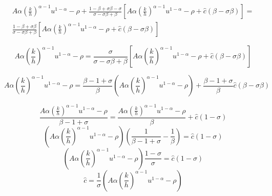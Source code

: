 \begin{equation*}
\begin{split}
A\alpha \left(\frac{k}{h}\right)^{\alpha-1}u^{1- \alpha}-\rho+\frac{1-\beta+\sigma\beta-\sigma}{\sigma-\sigma\beta+\beta}\left[A\alpha \left(\frac{k}{h}\right)^{\alpha-1}u^{1- \alpha}-\rho+\hat{c}(\beta-\sigma\beta)\right]=\\
\frac{1-\beta+\sigma\beta}{\sigma-\sigma\beta+\beta}\left[A\alpha \left(\frac{k}{h}\right)^{\alpha-1}u^{1- \alpha}-\rho+\hat{c}(\beta-\sigma\beta)\right]
\end{split}
\end{equation*}

\begin{equation*}
A\alpha \left(\frac{k}{h}\right)^{\alpha-1}u^{1- \alpha}-\rho=\frac{\sigma}{\sigma-\sigma\beta+\beta}\left[A\alpha \left(\frac{k}{h}\right)^{\alpha-1}u^{1- \alpha}-\rho+\hat{c}(\beta-\sigma\beta)\right]
\end{equation*}

\begin{equation*}
A\alpha \left(\frac{k}{h}\right)^{\alpha-1}u^{1- \alpha}-\rho=\frac{\beta-1+\sigma}{\beta}\left(A\alpha \left(\frac{k}{h}\right)^{\alpha-1}u^{1- \alpha}-\rho\right)+\frac{\beta-1+\sigma}{\beta}\hat{c}(\beta-\sigma\beta)
\end{equation*}

\begin{equation*}
\frac{A\alpha \left(\frac{k}{h}\right)^{\alpha-1}u^{1- \alpha}-\rho}{\beta-1+\sigma}=\frac{A\alpha \left(\frac{k}{h}\right)^{\alpha-1}u^{1- \alpha}-\rho}{\beta}+\hat{c}(1-\sigma)
\end{equation*}
\begin{equation*}
\left(A\alpha \left(\frac{k}{h}\right)^{\alpha-1}u^{1- \alpha}-\rho\right)\left(\frac{1}{\beta-1+\sigma}-\frac{1}{\beta}\right)=\hat{c}(1-\sigma)
\end{equation*}
\begin{equation*}
\left(A\alpha \left(\frac{k}{h}\right)^{\alpha-1}u^{1- \alpha}-\rho\right)\frac{1-\sigma}{\sigma}=\hat{c}(1-\sigma)
\end{equation*}
\begin{equation}
\boxed{\hat{c}=\frac{1}{\sigma}\left(A\alpha \left(\frac{k}{h}\right)^{\alpha-1}u^{1- \alpha}-\rho\right)}\label{KRRGG}
\end{equation}

